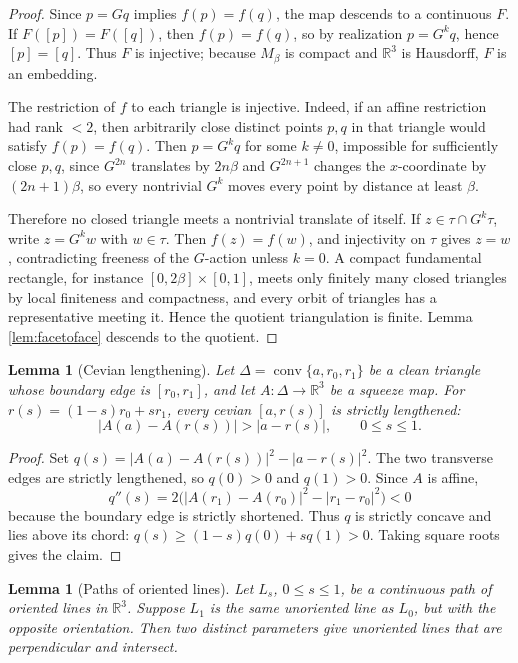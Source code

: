\documentclass[12pt]{article}
\newcommand{\R}{\mathbb R}
\theoremstyle{plain}
\newtheorem{lemma}[theorem]{Lemma}
\begin{document}
\begin{proof}
Since \(p=Gq\) implies \(f(p)=f(q)\), the map descends to a continuous
\(F\).  If \(F([p])=F([q])\), then \(f(p)=f(q)\), so by realization
\(p=G^kq\), hence \([p]=[q]\).  Thus \(F\) is injective; because \(M_\beta\)
is compact and \(\R^3\) is Hausdorff, \(F\) is an embedding.

The restriction of \(f\) to each triangle is injective.  Indeed, if an affine
restriction had rank \(<2\), then arbitrarily close distinct points
\(p,q\) in that triangle would satisfy \(f(p)=f(q)\).  Then \(p=G^kq\) for
some \(k\ne0\), impossible for sufficiently close \(p,q\), since
\(G^{2n}\) translates by \(2n\beta\) and \(G^{2n+1}\) changes the
\(x\)-coordinate by \((2n+1)\beta\), so every nontrivial \(G^k\) moves every
point by distance at least \(\beta\).

Therefore no closed triangle meets a nontrivial translate of itself.  If
\(z\in\tau\cap G^k\tau\), write \(z=G^kw\) with \(w\in\tau\).  Then
\(f(z)=f(w)\), and injectivity on \(\tau\) gives \(z=w\), contradicting
freeness of the \(G\)-action unless \(k=0\).  A compact fundamental rectangle,
for instance \([0,2\beta]\times[0,1]\), meets only finitely many closed
triangles by local finiteness and compactness, and every orbit of triangles has
a representative meeting it.  Hence the quotient triangulation is finite.
Lemma \ref{lem:facetoface} descends to the quotient.
\end{proof}

\begin{lemma}[Cevian lengthening]\label{lem:cevian}
Let \(\Delta=\operatorname{conv}\{a,r_0,r_1\}\) be a clean triangle whose
boundary edge is \([r_0,r_1]\), and let \(A:\Delta\to\R^3\) be a squeeze map.
For \(r(s)=(1-s)r_0+sr_1\), every cevian \([a,r(s)]\) is strictly lengthened:
\[
|A(a)-A(r(s))|>|a-r(s)|,\qquad 0\le s\le1.
\]
\end{lemma}

\begin{proof}
Set \(q(s)=|A(a)-A(r(s))|^2-|a-r(s)|^2\).  The two transverse edges are
strictly lengthened, so \(q(0)>0\) and \(q(1)>0\).  Since \(A\) is affine,
\[
q''(s)=2\bigl(|A(r_1)-A(r_0)|^2-|r_1-r_0|^2\bigr)<0
\]
because the boundary edge is strictly shortened.  Thus \(q\) is strictly
concave and lies above its chord:
\(q(s)\ge(1-s)q(0)+sq(1)>0\).  Taking square roots gives the claim.
\end{proof}

\begin{lemma}[Paths of oriented lines]\label{lem:lines}
Let \(L_s\), \(0\le s\le1\), be a continuous path of oriented lines in
\(\R^3\).  Suppose \(L_1\) is the same unoriented line as \(L_0\), but with the
opposite orientation.  Then two distinct parameters give unoriented lines that
are perpendicular and intersect.
\end{lemma}
\end{document}
